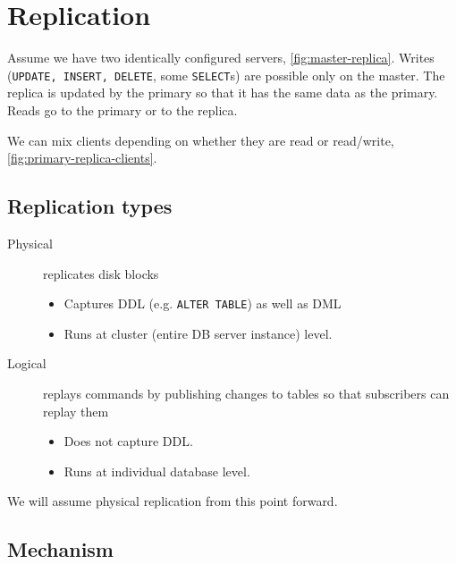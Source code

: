 \documentclass{pgnotes}
\begin{document}
\section{Replication}

Assume we have two identically configured servers, \autoref{fig:master-replica}.
Writes (\texttt{UPDATE, INSERT, DELETE}, some \texttt{SELECT}s) are possible only on the master.
The replica is updated by the primary so that it has the same data as the primary.
Reads go to the primary or to the replica.


We can mix clients depending on whether they are read or read/write, \autoref{fig:primary-replica-clients}.


\subsection{Replication types}

\begin{description}
\item[Physical] replicates disk blocks
  \begin{itemize}
  \item Captures DDL (e.g. \texttt{ALTER TABLE}) as well as DML
  \item Runs at cluster (entire DB server instance) level.
  \end{itemize}
\item[Logical] replays commands by publishing changes to tables so that subscribers can replay them
  \begin{itemize}
  \item Does not capture DDL.
  \item Runs at individual database level. 
  \end{itemize}
\end{description}
We will assume physical replication from this point forward.

\subsection{Mechanism}
\end{document}
